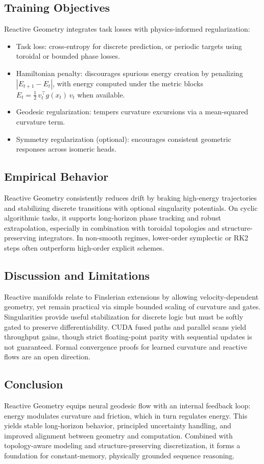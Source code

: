 \documentclass{article}
\numberwithin{equation}{section}
\begin{document}
\subsection{Training Objectives}
Reactive Geometry integrates task losses with physics-informed regularization:
\begin{itemize}
\item Task loss: cross-entropy for discrete prediction, or periodic targets using toroidal or bounded phase losses.
\item Hamiltonian penalty: discourages spurious energy creation by penalizing $|E_{t+1}-E_t|$, with energy computed under the metric blocks $E_t=\tfrac12\,v_t^\top g(x_t)\,v_t$ when available.
\item Geodesic regularization: tempers curvature excursions via a mean-squared curvature term.
\item Symmetry regularization (optional): encourages consistent geometric responses across isomeric heads.
\end{itemize}

\subsection{Empirical Behavior}
Reactive Geometry consistently reduces drift by braking high-energy trajectories and stabilizing discrete transitions with optional singularity potentials. On cyclic algorithmic tasks, it supports long-horizon phase tracking and robust extrapolation, especially in combination with toroidal topologies and structure-preserving integrators. In non-smooth regimes, lower-order symplectic or RK2 steps often outperform high-order explicit schemes.

\subsection{Discussion and Limitations}
Reactive manifolds relate to Finslerian extensions by allowing velocity-dependent geometry, yet remain practical via simple bounded scaling of curvature and gates. Singularities provide useful stabilization for discrete logic but must be softly gated to preserve differentiability. CUDA fused paths and parallel scans yield throughput gains, though strict floating-point parity with sequential updates is not guaranteed. Formal convergence proofs for learned curvature and reactive flows are an open direction.

\subsection{Conclusion}
Reactive Geometry equips neural geodesic flow with an internal feedback loop: energy modulates curvature and friction, which in turn regulates energy. This yields stable long-horizon behavior, principled uncertainty handling, and improved alignment between geometry and computation. Combined with topology-aware modeling and structure-preserving discretization, it forms a foundation for constant-memory, physically grounded sequence reasoning.
\end{document}
